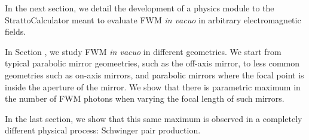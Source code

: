 \documentclass[11pt,SymmetricalJury]{inrsthesis/inrsthesis}
\begin{document}
\begin{description}
  In the next section, we detail the development of a physics module to the
  StrattoCalculator meant to evaluate FWM \textit{in vacuo} in arbitrary
  electromagnetic fields.

  In Section {}, we study FWM \textit{in vacuo} in different geometries. We start
  from typical parabolic mirror geomeetries, such as the off-axis mirror, to
  less common geometries such as on-axis mirrors, and parabolic mirrors where the
  focal point is inside the aperture of the mirror. We show that there is parametric
  maximum in the number of FWM photons when varying the focal length of such mirrors.

  In the last section, we show that this same maximum is observed in a completely
  different physical process: Schwinger pair production.

\end{description}


\end{document}
